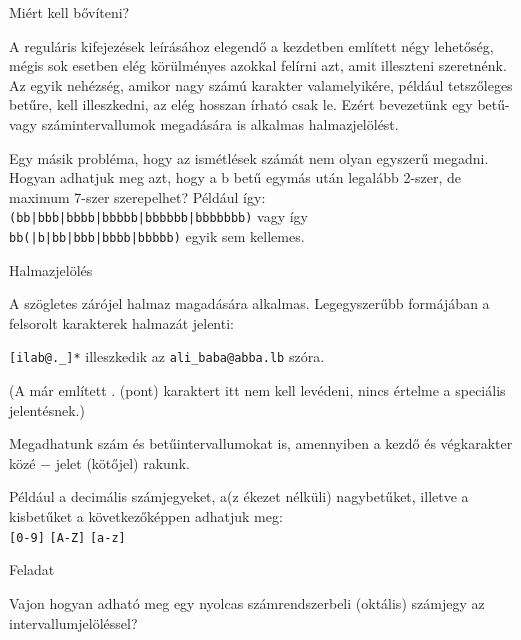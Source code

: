\documentclass[
    ignorenonframetext
    ]{beamer}
\begin{document}
\utolsooldal


\begin{frame}[fragile]
    {Miért kell bővíteni?}

    A reguláris kifejezések leírásához elegendő a kezdetben említett
    négy lehetőség, mégis sok esetben elég körülményes azokkal felírni
    azt, amit illeszteni szeretnénk. Az egyik nehézség, amikor \alert{nagy
    számú karakter valamelyikére}, például tetszőleges betűre, kell
    illeszkedni, az elég hosszan írható csak le.  Ezért bevezetünk egy
    \alert{betű- vagy számintervallumok megadására is alkalmas
    halmazjelölést}.

    \vfill
    Egy másik probléma, hogy az \alert{ismétlések számát} nem olyan
    egyszerű megadni. Hogyan adhatjuk meg azt, hogy a b betű egymás
    után legalább 2-szer, de maximum 7-szer szerepelhet? Például így:\\
    \verb"(bb|bbb|bbbb|bbbbb|bbbbbb|bbbbbbb)" \quad vagy így\\
    \verb"bb(|b|bb|bbb|bbbb|bbbbb)" \quad egyik sem kellemes.
\end{frame}

\begin{frame}[fragile]
    {Halmazjelölés}

    A szögletes zárójel halmaz magadására alkalmas. Legegyszerűbb
    formájában a felsorolt karakterek halmazát jelenti:

    \verb+[ilab@._]*+ illeszkedik az \verb+ali_baba@abba.lb+ szóra.

    (A már említett . (pont) karaktert itt nem kell levédeni, nincs
    értelme a speciális jelentésnek.)
    
    \vfill
    Megadhatunk szám és betűintervallumokat is, amennyiben a kezdő és
    végkarakter közé $-$ jelet (kötőjel) rakunk.

    Például a decimális számjegyeket, a(z ékezet nélküli) nagybetűket,
    illetve a kisbetűket a következőképpen adhatjuk meg:\\
    \verb"[0-9]" \quad
    \verb"[A-Z]" \quad
    \verb"[a-z]"
\end{frame}

\begin{frame}[fragile]
    {Feladat}

    Vajon hogyan adható meg egy nyolcas számrendszerbeli (oktális)
    számjegy az intervallumjelöléssel?




\end{frame}
\end{document}
